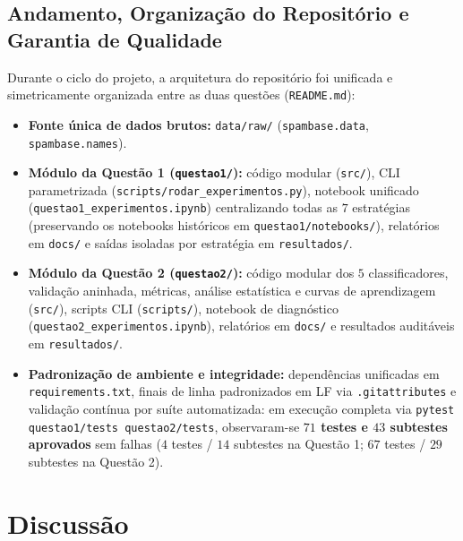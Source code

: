 \documentclass[a4paper,11pt]{article}
\begin{document}
\subsection{Andamento, Organização do Repositório e Garantia de Qualidade}\label{sec:2-4-andamento-organizacao-do-repositorio-e-garantia-de-qualidade}


Durante o ciclo do projeto, a arquitetura do repositório foi unificada e simetricamente organizada entre as duas questões (\texttt{README.md}):

\begin{itemize}[leftmargin=1.5em, itemsep=0.25em, topsep=0.25em]
  \item \textbf{Fonte única de dados brutos:} \texttt{data/\allowbreak raw/\allowbreak } (\texttt{spambase.data}, \texttt{spambase.names}).
  \item \textbf{Módulo da Questão 1 (\texttt{questao1/\allowbreak }):} código modular (\texttt{src/\allowbreak }), CLI parametrizada (\texttt{scripts/\allowbreak rodar\_\allowbreak experimentos.py}), notebook unificado (\texttt{questao1\_\allowbreak experimentos.ipynb}) centralizando todas as $7$ estratégias (preservando os notebooks históricos em \texttt{questao1/\allowbreak notebooks/\allowbreak }), relatórios em \texttt{docs/\allowbreak } e saídas isoladas por estratégia em \texttt{resultados/\allowbreak }.
  \item \textbf{Módulo da Questão 2 (\texttt{questao2/\allowbreak }):} código modular dos $5$ classificadores, validação aninhada, métricas, análise estatística e curvas de aprendizagem (\texttt{src/\allowbreak }), scripts CLI (\texttt{scripts/\allowbreak }), notebook de diagnóstico (\texttt{questao2\_\allowbreak experimentos.ipynb}), relatórios em \texttt{docs/\allowbreak } e resultados auditáveis em \texttt{resultados/\allowbreak }.
  \item \textbf{Padronização de ambiente e integridade:} dependências unificadas em \texttt{requirements.txt}, finais de linha padronizados em LF via \texttt{.gitattributes} e validação contínua por suíte automatizada: em execução completa via \texttt{pytest questao1/\allowbreak tests questao2/\allowbreak tests}, observaram-se \textbf{$71$ testes e $43$ subtestes aprovados} sem falhas ($4$ testes / $14$ subtestes na Questão 1; $67$ testes / $29$ subtestes na Questão 2).
\end{itemize}

\section{Discussão}\label{sec:3-discussao}
\end{document}
